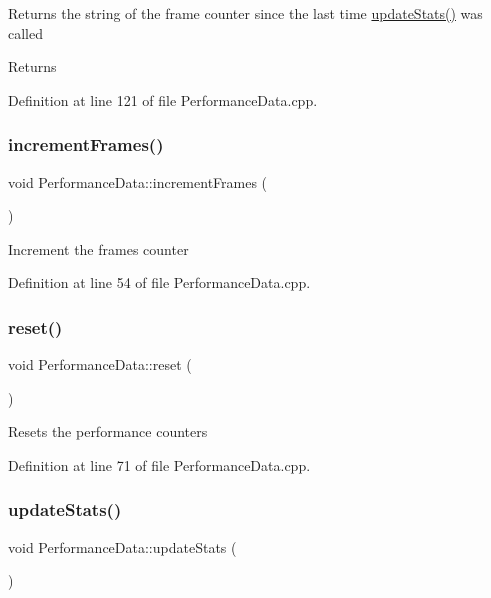 Returns the string of the frame counter since the last time \hyperlink{class_performance_data_a622d01a9d885596c79a799f03676c990}{update\+Stats()} was called \begin{DoxyReturn}{Returns}

\end{DoxyReturn}


Definition at line 121 of file Performance\+Data.\+cpp.

\mbox{\label{class_performance_data_ac852244b141ba327f30da7a5fd586d49}} 
\subsubsection{\texorpdfstring{increment\+Frames()}{incrementFrames()}}
{\footnotesize\ttfamily void Performance\+Data\+::increment\+Frames (\begin{DoxyParamCaption}{ }\end{DoxyParamCaption})}

Increment the frames counter 

Definition at line 54 of file Performance\+Data.\+cpp.

\mbox{\label{class_performance_data_a5a19e35de26351c6983f069d25ec5a95}} 
\subsubsection{\texorpdfstring{reset()}{reset()}}
{\footnotesize\ttfamily void Performance\+Data\+::reset (\begin{DoxyParamCaption}{ }\end{DoxyParamCaption})}

Resets the performance counters 

Definition at line 71 of file Performance\+Data.\+cpp.

\mbox{\label{class_performance_data_a622d01a9d885596c79a799f03676c990}} 
\subsubsection{\texorpdfstring{update\+Stats()}{updateStats()}}
{\footnotesize\ttfamily void Performance\+Data\+::update\+Stats (\begin{DoxyParamCaption}{ }\end{DoxyParamCaption})}

